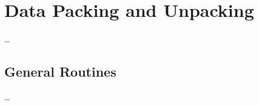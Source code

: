 \chapter{Data Packing and Unpacking}
\label{chap:api_data_mgmt}

\ldots

\section{General Routines}
\label{chap:api_init:general}

\ldots

\subsection{}


